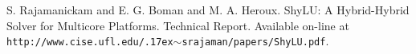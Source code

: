 
\begin{thebibliography}{10}

{\sc S. Rajamanickam and E. G. Boman and M. A. Heroux}. {ShyLU: A Hybrid-Hybrid Solver for Multicore Platforms}. Technical Report. Available on-line at {\tt http://www.cise.ufl.edu/{\raise.17ex\hbox{$\scriptstyle\mathtt{\sim}$}}srajaman/papers/ShyLU.pdf}.

\end{thebibliography}

